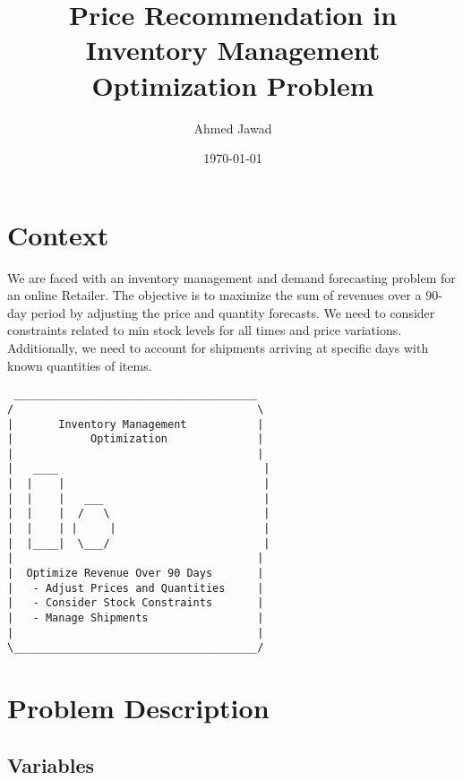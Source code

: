 \documentclass{article}
\title{Price Recommendation in Inventory Management Optimization Problem}
\author{ Ahmed Jawad}
\date{\today}
\begin{document}
\maketitle

\section*{Context}

We are faced with an inventory management and demand forecasting problem for an online Retailer. The objective is to maximize the sum of revenues over a 90-day period by adjusting the price and quantity forecasts. We need to consider constraints related to min stock levels for all times and price variations. Additionally, we need to account for shipments arriving at specific days with known quantities of items.

\begin{verbatim}
 ______________________________________
/                                      \
|       Inventory Management           |
|            Optimization              |
|                                      |
|   ____                                |
|  |    |                               |
|  |    |   ___                         |
|  |    |  /   \                        |
|  |    | |     |                       |
|  |____|  \___/                        |
|                                      |
|  Optimize Revenue Over 90 Days       |
|   - Adjust Prices and Quantities     |
|   - Consider Stock Constraints       |
|   - Manage Shipments                 |
|                                      |
\______________________________________/
\end{verbatim}


\section*{Problem Description}

\subsection*{Variables}
\end{document}
